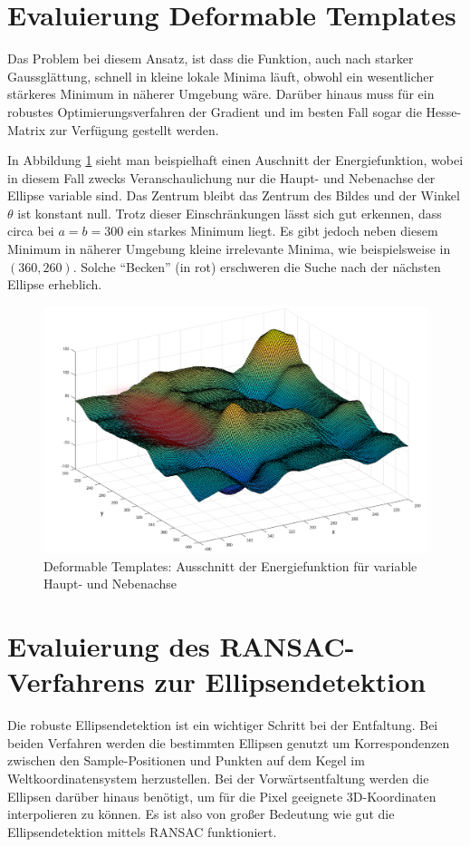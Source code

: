 \section{Evaluierung Deformable Templates} 
Das Problem bei diesem Ansatz, ist dass die Funktion, auch nach starker Gaussglättung, schnell in kleine lokale Minima läuft, obwohl ein wesentlicher stärkeres Minimum in näherer Umgebung wäre. Darüber hinaus muss für ein robustes Optimierungsverfahren der Gradient und im besten Fall sogar die Hesse-Matrix zur Verfügung gestellt werden. 

In Abbildung \ref{fig:deformable} sieht man beispielhaft einen Auschnitt der Energiefunktion, wobei in diesem Fall zwecks Veranschaulichung nur die Haupt- und Nebenachse der Ellipse variable sind. Das Zentrum bleibt das Zentrum des Bildes und der Winkel $\theta$ ist konstant null. Trotz dieser Einschränkungen lässt sich gut erkennen, dass circa bei $a = b = 300$ ein starkes Minimum liegt. Es gibt jedoch neben diesem Minimum in näherer Umgebung kleine irrelevante Minima, wie beispielsweise in $(360, 260)$. Solche "`Becken"' (in rot) erschweren die Suche nach der nächsten Ellipse erheblich.


\begin{figure}[!htb]
	\centering
	\includegraphics[scale=.4]{images/deformableHighlighted.png}
	\caption{Deformable Templates: Ausschnitt der Energiefunktion für variable Haupt- und Nebenachse}
	\label{fig:deformable}
\end{figure}


\section{Evaluierung des RANSAC-Verfahrens zur Ellipsendetektion}
Die robuste Ellipsendetektion ist ein wichtiger Schritt bei der Entfaltung. Bei beiden Verfahren werden die bestimmten Ellipsen genutzt um Korrespondenzen zwischen den Sample-Positionen und Punkten auf dem Kegel im Weltkoordinatensystem herzustellen. Bei der Vorwärtsentfaltung werden die Ellipsen darüber hinaus benötigt, um für die Pixel geeignete 3D-Koordinaten interpolieren zu können. Es ist also von großer Bedeutung wie gut die Ellipsendetektion mittels RANSAC funktioniert.  


